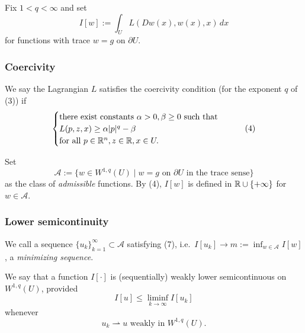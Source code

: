 Fix $1<q<\infty$ and set
\[
I[w]:=\int_U L(Dw(x),w(x),x)\,dx
\tag{1}
\]
for functions with trace $w=g$ on $\partial U$.

\subsubsection{Coercivity}

\begin{definition}
\label{def:coercivity-condition-lagrangian}
We say the Lagrangian $L$ satisfies the coercivity condition (for the exponent $q$ of (3)) if
\[
\begin{cases}
\text{there exist constants } \alpha > 0, \beta \geq 0 \text{ such that} \\
L(p, z, x) \geq \alpha|p|^q - \beta \\
\text{for all } p \in \mathbb{R}^n, z \in \mathbb{R}, x \in U.
\end{cases}
\tag{4}
\]
\end{definition}

\begin{definition}
\label{def:admissible-class-sobolev-minimization}

Set
\[
\mathcal{A} := \{w \in W^{1,q}(U) \mid w = g \text{ on } \partial U \text{ in the trace sense}\}
\]
as the class of \textit{admissible} functions. By (4), $I[w]$ is defined in
$\mathbb{R}\cup\{+\infty\}$ for $w\in\mathcal A$.
\end{definition}

\subsubsection{Lower semicontinuity}

\begin{definition}
\label{def:minimizing-sequence-calculus-of-variations}

We call a sequence $\{u_k\}_{k=1}^{\infty} \subset \mathcal{A}$ satisfying (7), i.e.\ $I[u_k]\to m := \inf_{w\in\mathcal{A}} I[w]$, a \textit{minimizing sequence}.
\end{definition}

\begin{definition}
\label{def:weakly-lower-semicontinuous-functional}
We say that a function $I[\cdot]$ is (sequentially) weakly lower semicontinuous on $W^{1,q}(U)$, provided
\[
I[u] \leq \liminf_{k \to \infty} I[u_k]
\]
whenever
\[
u_k \rightharpoonup u \text{ weakly in } W^{1,q}(U).
\]
\end{definition}

